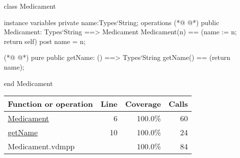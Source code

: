 \begin{vdmpp}[breaklines=true]
class Medicament

instance variables
  private name:Types`String;
operations
(*@
\label{Medicament:6}
@*)
 public Medicament: Types`String ==> Medicament
  Medicament(n) == (name := n; return self)
 post name = n;
 
(*@
\label{getName:10}
@*)
 pure public getName: () ==> Types`String
  getName() == (return name);

end Medicament
\end{vdmpp}
\bigskip
\begin{longtable}{|l|r|r|r|}
\hline
Function or operation & Line & Coverage & Calls \\
\hline
\hline
\hyperref[Medicament:6]{Medicament} & 6&100.0\% & 60 \\
\hline
\hyperref[getName:10]{getName} & 10&100.0\% & 24 \\
\hline
\hline
Medicament.vdmpp & & 100.0\% & 84 \\
\hline
\end{longtable}

